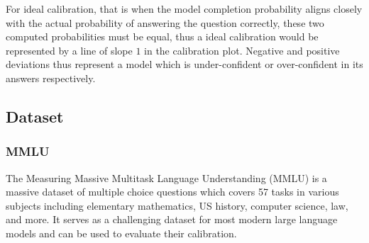\documentclass[11pt]{article}
\begin{document}
For ideal calibration, that is when the model completion probability aligns
closely with the actual probability of answering the question correctly, these 
two computed probabilities must be equal, thus a ideal calibration would be 
represented  by a line of slope $1$ in the calibration plot. Negative 
and positive deviations thus represent a model which is under-confident 
or over-confident  in its answers respectively.

\subsection{Dataset}

\subsubsection{MMLU}
The Measuring Massive Multitask Language Understanding (MMLU) 
\cite{hendrycks2021measuring} is a massive dataset of multiple choice 
questions which covers 57 tasks in various subjects including 
elementary mathematics, US history, computer science, law, and more. It 
serves as a challenging dataset for most modern large language models and can be used to evaluate their calibration.
\end{document}
